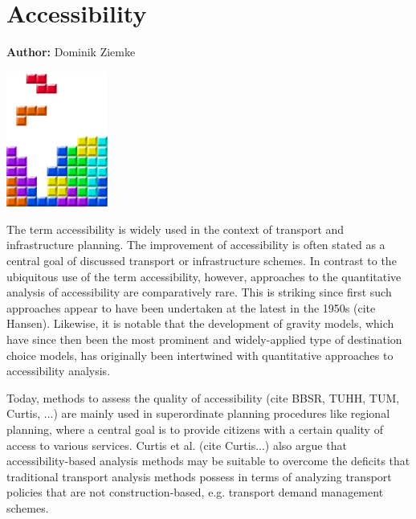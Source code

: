 \chapter{Accessibility }
\label{ch:accessibility}

\hfill \textbf{Author:} Dominik Ziemke

\begin{center} \includegraphics[width=0.25\textwidth, angle=0]{figures/MATSimBook.png} \end{center}


The term accessibility is widely used in the context of transport and
infrastructure planning. The improvement of accessibility is often stated as a
central goal of discussed transport or infrastructure schemes. In contrast to the
ubiquitous use of the term accessibility, however, approaches to the quantitative analysis
of accessibility are comparatively rare. This is striking since first such
approaches appear to have been undertaken at the latest in the 1950s (cite Hansen).
Likewise, it is notable that the development of gravity models, which have since
then been the most prominent and widely-applied type of destination choice models,
has originally been intertwined with quantitative approaches to accessibility
analysis.

Today, methods to assess the quality of accessibility (cite BBSR, TUHH, TUM,
Curtis, ...) are mainly used in superordinate planning procedures like regional
planning, where a central goal is to provide citizens with a certain quality of
access to various services. Curtis et al. (cite Curtis...) also argue that
accessibility-based analysis methods may be suitable to overcome the deficits that
traditional transport analysis methods possess in terms of analyzing transport
policies that are not construction-based, e.g. transport demand management schemes.

